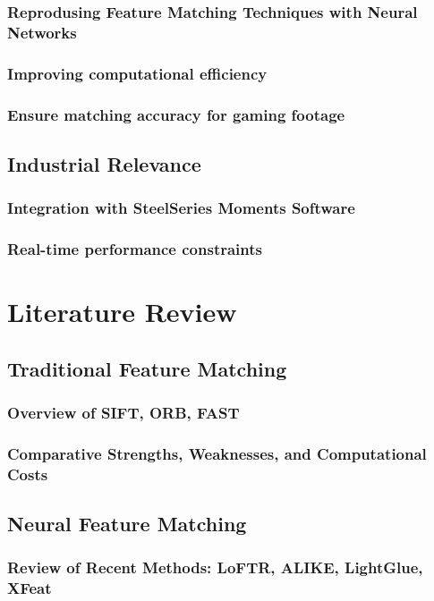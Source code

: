 \documentclass[a4paper,12pt]{report}
\begin{document}
\subsection{Reprodusing Feature Matching Techniques with Neural Networks}
\subsection{Improving computational efficiency}
\subsection{Ensure matching accuracy for gaming footage}

\section{Industrial Relevance}
\subsection{Integration with SteelSeries Moments Software}
\subsection{Real-time performance constraints}

\chapter{Literature Review}
\section{Traditional Feature Matching}
\subsection{Overview of SIFT, ORB, FAST}
\subsection{Comparative Strengths, Weaknesses, and Computational Costs}

\section{Neural Feature Matching}
\subsection{Review of Recent Methods: LoFTR, ALIKE, LightGlue, XFeat}
\end{document}
